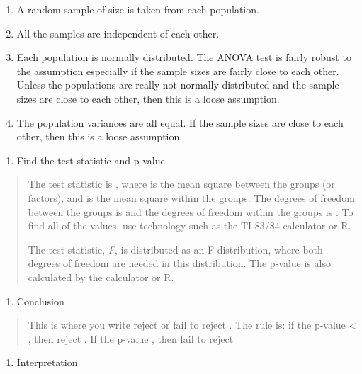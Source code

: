 \documentclass[]{book}
\providecommand{\tightlist}{%
  \setlength{\itemsep}{0pt}\setlength{\parskip}{0pt}}
\begin{document}
\begin{enumerate}
\def\labelenumi{\alph{enumi}.}
\item
  A random sample of size is taken from each population.
\item
  All the samples are independent of each other.
\item
  Each population is normally distributed. The ANOVA test is fairly robust to the assumption especially if the sample sizes are fairly close to each other. Unless the populations are really not normally distributed and the sample sizes are close to each other, then this is a loose assumption.
\item
  The population variances are all equal. If the sample sizes are close to each other, then this is a loose assumption.
\end{enumerate}

\begin{enumerate}
\def\labelenumi{\arabic{enumi}.}
\setcounter{enumi}{3}
\tightlist
\item
  Find the test statistic and p-value
\end{enumerate}

\begin{quote}
The test statistic is , where is the mean square between the groups (or factors), and is the mean square within the groups. The degrees of freedom between the groups is and the degrees of freedom within the groups is . To find all of the values, use technology such as the TI-83/84 calculator or R.

The test statistic, \emph{F}, is distributed as an F-distribution, where both degrees of freedom are needed in this distribution. The p-value is also calculated by the calculator or R.
\end{quote}

\begin{enumerate}
\def\labelenumi{\arabic{enumi}.}
\setcounter{enumi}{4}
\tightlist
\item
  Conclusion
\end{enumerate}

\begin{quote}
This is where you write reject or fail to reject . The rule is: if the p-value \textless{} , then reject . If the p-value , then fail to reject
\end{quote}

\begin{enumerate}
\def\labelenumi{\arabic{enumi}.}
\setcounter{enumi}{5}
\tightlist
\item
  Interpretation
\end{enumerate}
\end{document}
